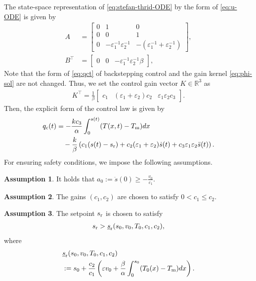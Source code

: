 \documentclass[letterpaper, 10 pt, conference]{cls/ieeeconf}
\theoremstyle{definition}
\newtheorem{assum}{Assumption}
\newcommand{\ep}{\varepsilon}
\newcommand{\bbR}{\mathbb{R}}
\begin{document}
The state-space representation of \eqref{eq:stefan-thrid-ODE} by the form of \eqref{eq:u-ODE} is given by 
\begin{align}
    A & = \left [
    \begin{array}{ccc}
       0  & 1 & 0 \\
       0 & 0 & 1 \\
       0  & - \ep_1^{-1} \ep_2^{-1} &  - (\ep_1^{-1} + \ep_2^{-1})
    \end{array}
    \right] , \\
    B^\top &=\left [
    \begin{array}{ccc}
       0  &
       0 &
       - \ep_1^{-1} \ep_2^{-1} \beta
    \end{array}
    \right]  , 
\end{align}
Note that the form of \eqref{eq:qct} of backstepping control and the gain kernel \eqref{eq:phi-sol} are not changed. Thus, we set the control gain vector $K \in \bbR^3$ as 
\begin{align}
    K^\top = \frac{1}{\beta}
    \left [
    \begin{array}{ccc}
       c_1  & 
       (\ep_1 + \ep_2) c_2 & 
       \ep_1 \ep_2 c_3 
    \end{array}
    \right]  .  
\end{align}
Then, the explicit form of the control law is given by 
\begin{align}
    q_{\rm c}(t)
    & = - \frac{ k c_3}{\alpha}  \int_0^{s(t)}  (T(x,t) - T_{\rm m})  dx \notag\\
    & \quad - \frac{k}{\beta} \left (c_1 (s(t) - s_{\rm r}) + c_2 (\ep_1 + \ep_2)  \dot s(t) + c_3 \ep_1 \ep_2 \ddot s(t) \right).  \label{eq:third-qct-exp}
\end{align}
For ensuring safety conditions, we impose the following assumptions. 
\begin{assum} \label{ass:a0}
  It holds that $ a_0 := \ddot s(0) \geq - \frac{v_0}{\ep_1}$. 
\end{assum}
\begin{assum} \label{ass:third-gain12} 
The gains $(c_1, c_2)$ are chosen to satisfy
$0 < c_1 \leq c_2$. 
\end{assum}
\begin{assum} \label{ass:third-setpoint}
The setpoint $s_{\rm r}$ is chosen to satisfy 
    \begin{align}
    s_{\rm r} > \underline{s}_{\rm r}(s_0, v_0, T_0, c_1, c_2)  , \label{eq:third-setpoint}
    \end{align}
    where 
    \begin{eqnarray}
   & \underline{s}_{\rm r}(s_0, v_0, T_0, c_1, c_2) \notag\\
    &:= s_0 + \frac{c_2}{c_1} \left( \ep v_0 + \frac{  \beta}{ \alpha }  \int_0^{s_0}  (T_0(x) - T_{\rm m})  dx \right). \label{eq:third-srunder}
    \end{eqnarray} 
\end{assum}
\end{document}
